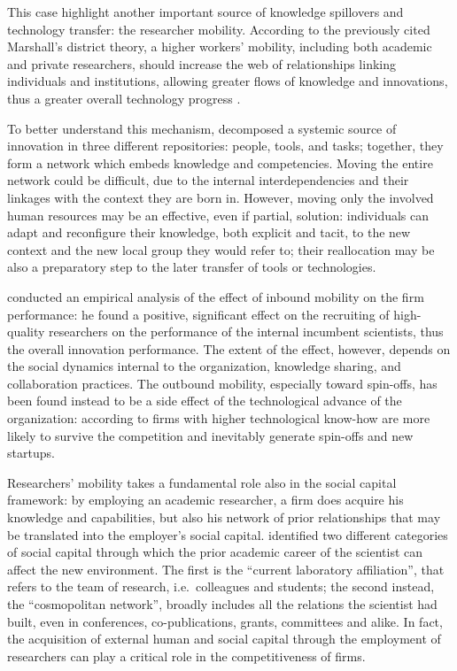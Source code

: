 This case highlight another important source of knowledge spillovers and technology transfer: the researcher mobility. According to the previously cited Marshall's district theory, a higher workers' mobility, including both academic and private researchers, should increase the web of relationships linking individuals and institutions, allowing greater flows of knowledge and innovations, thus a greater overall technology progress \citep{Cantner2006}.

To better understand this mechanism, \citet{Argote2000} decomposed a systemic source of innovation in three different repositories: people, tools, and tasks; together, they form a network which embeds knowledge and competencies. Moving the entire network could be difficult, due to the internal interdependencies and their linkages with the context they are born in. However, moving only the involved human resources may be an effective, even if partial, solution: individuals can adapt and reconfigure their knowledge, both explicit and tacit, to the new context and the new local group they would refer to; their reallocation may be also a preparatory step to the later transfer of tools or technologies. 

\citet{Slavova2015} conducted an empirical analysis of the effect of inbound mobility on the firm performance: he found a positive, significant effect on the recruiting of high-quality researchers on the performance of the internal incumbent scientists, thus the overall innovation performance. The extent of the effect, however, depends on the social dynamics internal to the organization, knowledge sharing, and collaboration practices. The outbound mobility, especially toward spin-offs, has been found instead to be a side effect of the technological advance of the organization: according to \citet{Franco2000} firms with higher technological know-how are more likely to survive the competition and inevitably generate spin-offs and new startups.

Researchers' mobility takes a fundamental role also in the social capital framework: by employing an academic researcher, a firm does acquire his knowledge and capabilities, but also his network of prior relationships that may be translated into the employer's social capital. \citet{Murray2004} identified two different categories of social capital through which the prior academic career of the scientist can affect the new environment. The first is the \enquote{current laboratory affiliation}, that refers to the team of research, i.e.\ colleagues and students; the second instead, the \enquote{cosmopolitan network}, broadly includes all the relations the scientist had built, even in conferences, co-publications, grants, committees and alike. In fact, the acquisition of external human and social capital through the employment of researchers can play a critical role in the competitiveness of firms.

